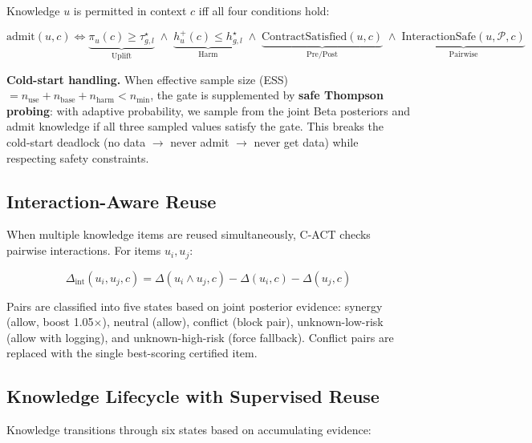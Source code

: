 \documentclass[letterpaper]{article}
\begin{document}
Knowledge $u$ is permitted in context $c$ iff all four conditions hold:

\begin{equation}
\boxed{
\text{admit}(u,c) \Longleftrightarrow
\underbrace{\pi_u(c) \ge \tau_{g,l}^\star}_{\text{Uplift}}
\;\land\;
\underbrace{h_u^+(c) \le h_{g,l}^\star}_{\text{Harm}}
\;\land\;
\underbrace{\text{ContractSatisfied}(u,c)}_{\text{Pre/Post}}
\;\land\;
\underbrace{\text{InteractionSafe}(u, \mathcal{P}, c)}_{\text{Pairwise}}
}
\end{equation}

\textbf{Cold-start handling.} When effective sample size (ESS) $= n_{\text{use}} + n_{\text{base}} + n_{\text{harm}} < n_{\min}$, the gate is supplemented by \textbf{safe Thompson probing}: with adaptive probability, we sample from the joint Beta posteriors and admit knowledge if all three sampled values satisfy the gate. This breaks the cold-start deadlock (no data $\rightarrow$ never admit $\rightarrow$ never get data) while respecting safety constraints.

\subsection{Interaction-Aware Reuse}

When multiple knowledge items are reused simultaneously, \textsc{C-ACT} checks pairwise interactions. For items $u_i, u_j$:

\begin{equation}
\Delta_{\text{int}}(u_i, u_j, c) = \Delta(u_i \land u_j, c) - \Delta(u_i, c) - \Delta(u_j, c)
\end{equation}

Pairs are classified into five states based on joint posterior evidence: synergy (allow, boost 1.05$\times$), neutral (allow), conflict (block pair), unknown-low-risk (allow with logging), and unknown-high-risk (force fallback). Conflict pairs are replaced with the single best-scoring certified item.

\subsection{Knowledge Lifecycle with Supervised Reuse}

Knowledge transitions through six states based on accumulating evidence:

\begin{center}
\end{center}
\end{document}
